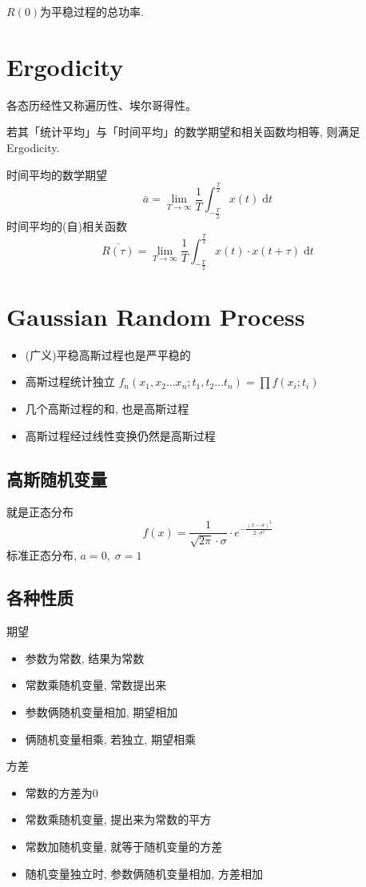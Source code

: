 \documentclass[a4paper]{report}
\begin{document}
$R(0)$为平稳过程的总功率. 

\section{Ergodicity}
各态历经性又称遍历性、埃尔哥得性。

若其「统计平均」与「时间平均」的数学期望和相关函数均相等, 则满足Ergodicity. 

时间平均的数学期望
\begin{equation}
  \bar{a}=\lim_{T\rightarrow\infty} \frac{1}{T}\int_{-\frac{T}{2}}^{\frac{T}{2}} x(t)\;\text{d}t
\end{equation}
时间平均的(自)相关函数
\begin{equation}
  \overline{R(\tau)}=\lim_{T\rightarrow\infty} \frac{1}{T}\int_{-\frac{T}{2}}^{\frac{T}{2}} x(t)\cdot x(t+\tau)\;\text{d}t
\end{equation}
\section{Gaussian Random Process}
\begin{itemize}
  \item (广义)平稳高斯过程也是严平稳的
  \item 高斯过程统计独立 $f_n(x_1,x_2\dots x_n;t_1,t_2\dots t_n)=\prod f(x_i;t_i)$
  \item 几个高斯过程的和, 也是高斯过程
  \item 高斯过程经过线性变换仍然是高斯过程
\end{itemize}
\subsection{高斯随机变量}
就是正态分布
\begin{equation}
  f(x)=\frac{1}{\sqrt{2\pi}\cdot\sigma}\cdot e^{-\frac{(x-a)^2}{2\cdot\sigma^2}}
\end{equation}
标准正态分布, $a=0,\;\sigma=1$
\subsection{各种性质}
期望
\begin{itemize}
  \item 参数为常数, 结果为常数
  \item 常数乘随机变量, 常数提出来
  \item 参数俩随机变量相加, 期望相加
  \item 俩随机变量相乘, 若独立, 期望相乘
\end{itemize}
方差
\begin{itemize}
  \item 常数的方差为0
  \item 常数乘随机变量, 提出来为常数的平方
  \item 常数加随机变量, 就等于随机变量的方差
  \item 随机变量独立时, 参数俩随机变量相加, 方差相加
\end{itemize}
\end{document}
